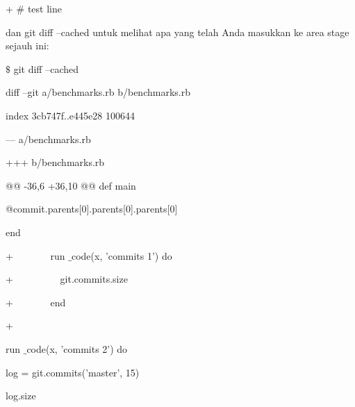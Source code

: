 \noindent 
{\fontsize{14pt}{14pt}\selectfont + $  \#  $ test line \\} \par
\noindent 
{\fontsize{14pt}{14pt}\selectfont dan $  $git diff --cached $  $untuk melihat apa yang telah Anda masukkan ke area stage sejauh ini: \\} \par
\noindent 
{\fontsize{14pt}{14pt}\selectfont  $  \$  $ git diff --cached \\} \par
\noindent 
{\fontsize{14pt}{14pt}\selectfont diff --git a/benchmarks.rb b/benchmarks.rb \\} \par
\noindent 
{\fontsize{14pt}{14pt}\selectfont index 3cb747f..e445e28 100644 \\} \par
\noindent 
{\fontsize{14pt}{14pt}\selectfont --- a/benchmarks.rb \\} \par
\noindent 
{\fontsize{14pt}{14pt}\selectfont +++ b/benchmarks.rb \\} \par
\noindent 
{\fontsize{14pt}{14pt}\selectfont @@ -36,6 +36,10 @@ def main \\} \par
\noindent 
{\fontsize{14pt}{14pt}\selectfont @commit.parents[0].parents[0].parents[0] \\} \par
\noindent 
{\fontsize{14pt}{14pt}\selectfont end \\} \par
\vspace{14pt}
\noindent 
{\fontsize{14pt}{14pt}\selectfont +~~~~~~~ run $  \_  $code(x, 'commits 1') do \\} \par
\noindent 
{\fontsize{14pt}{14pt}\selectfont +~~~~~~~~~ git.commits.size \\} \par
\noindent 
{\fontsize{14pt}{14pt}\selectfont +~~~~~~~ end \\} \par
\noindent 
{\fontsize{14pt}{14pt}\selectfont + \\} \par
\noindent 
{\fontsize{14pt}{14pt}\selectfont run $  \_  $code(x, 'commits 2') do \\} \par
\noindent 
{\fontsize{14pt}{14pt}\selectfont log = git.commits('master', 15) \\} \par
\noindent 
{\fontsize{14pt}{14pt}\selectfont log.size \\} \par
\vspace{14pt}
